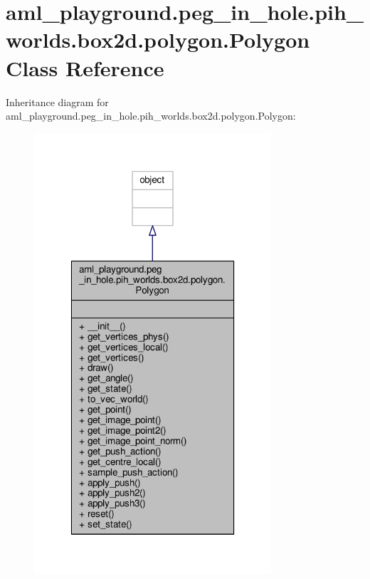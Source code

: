 \hypertarget{classaml__playground_1_1peg__in__hole_1_1pih__worlds_1_1box2d_1_1polygon_1_1_polygon}{\section{aml\-\_\-playground.\-peg\-\_\-in\-\_\-hole.\-pih\-\_\-worlds.\-box2d.\-polygon.\-Polygon Class Reference}
\label{classaml__playground_1_1peg__in__hole_1_1pih__worlds_1_1box2d_1_1polygon_1_1_polygon}
}


Inheritance diagram for aml\-\_\-playground.\-peg\-\_\-in\-\_\-hole.\-pih\-\_\-worlds.\-box2d.\-polygon.\-Polygon\-:\nopagebreak
\begin{figure}[H]
\begin{center}
\leavevmode
\includegraphics[width=250pt]{classaml__playground_1_1peg__in__hole_1_1pih__worlds_1_1box2d_1_1polygon_1_1_polygon__inherit__graph}
\end{center}
\end{figure}



